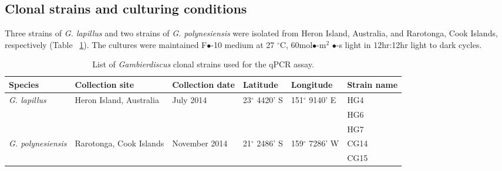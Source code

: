 \documentclass[12pt]{article}
\begin{document}
\subsection{Clonal strains and culturing conditions}
Three strains of \emph{G. lapillus} and two strains of \emph{G. polynesiensis} were isolated from Heron Island, Australia, and Rarotonga, Cook Islands, respectively (Table ~\ref{tbl:StrainTable}). The cultures were maintained F$\bullet$-10 medium at 27 $^{\circ}$C, 60mol$\bullet$-m$^{2}$ $\bullet$-s light in 12hr:12hr light to dark cycles.
\FloatBarrier
\begin{table}
\caption{List of \emph{Gambierdiscus} clonal strains used for the qPCR assay.}
\label{tbl:StrainTable}
\begin{tabular}{  | p{2cm} | p{2cm} | p{2cm}| p{3cm} | p{3cm} | p{2cm} | }
\hline
\textbf{Species}  & \textbf{Collection site} &  \textbf{Collection date} &\textbf{Latitude} & \textbf{Longitude} & \textbf{Strain name} \\
  \hline
   \emph{G. lapillus}   &Heron Island, Australia &July 2014 &23$^{\circ}$ 4420' S&151$^{\circ}$ 9140' E  & HG4 \\
   \hline
&&&&& HG6\\
 \hline
 &&&& &HG7\\
 \hline
\emph{G. polynesiensis}&Rarotonga, Cook Islands&November 2014 &21$^{\circ}$ 2486' S&159$^{\circ}$ 7286' W  & CG14 \\
 \hline
&&&&&CG15\\
    \hline
 \end{tabular}
\end{table}
\end{document}
